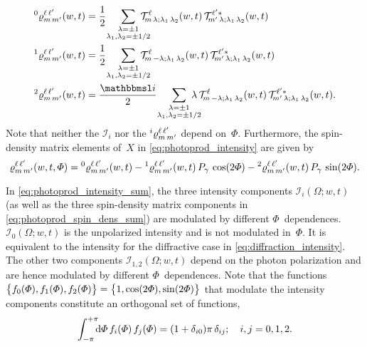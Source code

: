 \begin{align}
  \label{eq:photoprod_rho_0}
  \prescript{0}{}{\varrho}^{\ell\, \ell'}_{m\, m'}(w, t)
  ={}& \frac{1}{2}\quad \sum_{\substack{\lambda = \pm 1 \\ \mathclap{\lambda_1, \lambda_2 = \pm 1/2}}}
  \mathcal{T}^\ell_{\!m\, \lambda; \lambda_1\, \lambda_2}(w, t)\,
  \mathcal{T}^{\ell' *}_{\!m'\, \lambda; \lambda_1\, \lambda_2}(w, t)
  \\
  \label{eq:photoprod_rho_1}
  \prescript{1}{}{\varrho}^{\ell\, \ell'}_{m\, m'}(w, t)
  ={}& \frac{1}{2}\quad \sum_{\substack{\lambda = \pm 1 \\ \mathclap{\lambda_1, \lambda_2 = \pm 1/2}}}
  \mathcal{T}^\ell_{\!m\, {-\lambda}; \lambda_1\, \lambda_2}(w, t)\,
  \mathcal{T}^{\ell' *}_{\!m'\, \lambda; \lambda_1\, \lambda_2}(w, t)
  \\
  \label{eq:photoprod_rho_2}
  \prescript{2}{}{\varrho}^{\ell\, \ell'}_{m\, m'}(w, t)
  ={}& \frac{\imag}{2}\quad \sum_{\substack{\lambda = \pm 1 \\ \mathclap{\lambda_1, \lambda_2 = \pm 1/2}}}
  \lambda\,
  \mathcal{T}^\ell_{\!m\, {-\lambda}; \lambda_1\, \lambda_2}(w, t)\,
  \mathcal{T}^{\ell' *}_{\!m'\, \lambda; \lambda_1\, \lambda_2}(w, t).
\end{align}
Note that neither the $\mathcal{I}_i$ nor the
$\prescript{i}{}{\varrho}^{\ell\, \ell'}_{m\, m'}$ depend on~$\Phi$.
Furthermore, the spin-density matrix elements of~$X$ in
\cref{eq:photoprod_intensity} are given by
\begin{equation}
  \label{eq:photoprod_spin_dens_sum}
  \varrho^{\ell\, \ell'}_{m\, m'}(w, t, \Phi)
  = \prescript{0}{}{\varrho}^{\ell\, \ell'}_{m\, m'}(w, t)
  - \prescript{1}{}{\varrho}^{\ell\, \ell'}_{m\, m'}(w, t)\, P_\gamma\, \cos(2 \Phi)
  - \prescript{2}{}{\varrho}^{\ell\, \ell'}_{m\, m'}(w, t)\, P_\gamma\, \sin(2 \Phi).
\end{equation}

In \cref{eq:photoprod_intensity_sum}, the three intensity components
$\mathcal{I}_i(\Omega; w, t)$ (as well as the three spin-density
matrix components in \cref{eq:photoprod_spin_dens_sum}) are modulated
by different $\Phi$~dependences.  $\mathcal{I}_0(\Omega; w, t)$ is the
unpolarized intensity and is not modulated in~$\Phi$.  It is
equivalent to the intensity for the diffractive case in
\cref{eq:diffraction_intensity}.  The other two components
$\mathcal{I}_{1, 2}(\Omega; w, t)$ depend on the photon polarization
and are hence modulated by different $\Phi$~dependences.  Note that
the functions $\cBrk[1]{f_0(\Phi), f_1(\Phi), f_2(\Phi)} = \cBrk[1]{1,
\cos(2 \Phi), \sin(2 \Phi)}$ that modulate the intensity components
constitute an orthogonal set of functions, \ie
\begin{equation}
  \label{eq:photoprod_orthogonality_phi}
  \int_{-\pi}^{+\pi}\!\!\! \dif{\Phi}\, f_i(\Phi)\, f_j(\Phi)
  = (1 + \delta_{i 0}) \pi\, \delta_{i j};
  \quad i, j = 0 ,1, 2.
\end{equation}

